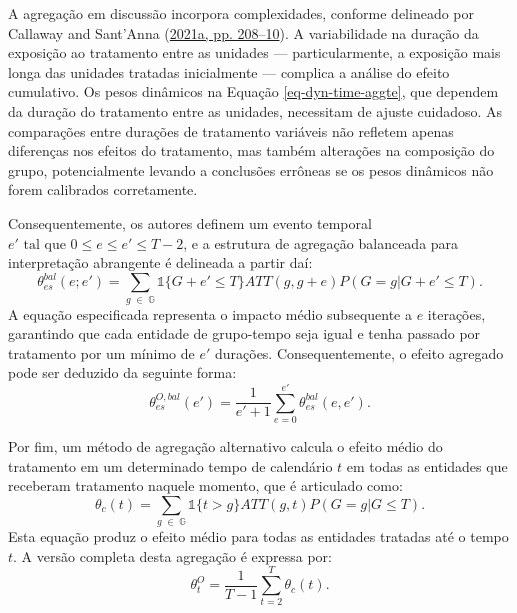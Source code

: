 \documentclass[12pt, a4paper, twoside]{article}
\numberwithin{equation}{subsection} %
\begin{document}
A agregação em discussão incorpora complexidades, conforme delineado por
Callaway and Sant'Anna (\protect\hyperlink{ref-CALLAWAY2021200}{2021a,
pp. 208--10}). A variabilidade na duração da exposição ao tratamento
entre as unidades --- particularmente, a exposição mais longa das
unidades tratadas inicialmente --- complica a análise do efeito
cumulativo. Os pesos dinâmicos na Equação \eqref{eq-dyn-time-aggte}, que
dependem da duração do tratamento entre as unidades, necessitam de
ajuste cuidadoso. As comparações entre durações de tratamento variáveis
\hspace{0pt}\hspace{0pt}não refletem apenas diferenças nos efeitos do
tratamento, mas também alterações na composição do grupo, potencialmente
levando a conclusões errôneas se os pesos dinâmicos não forem calibrados
corretamente.

Consequentemente, os autores definem um evento temporal
\(e' \text{ tal que } 0 \leq e \leq e' \leq T - 2\), e a estrutura de
agregação balanceada para interpretação abrangente é delineada a partir
daí: \begin{equation} \label{eq-bal-dyn-time-aggte}
\theta_{es}^{bal}(e; e') = \sum_{g \; \in \; \mathbb{G}} \mathds{1}\{G + e' \leq T\} ATT(g, g + e) ​​P(G = g|G + e' \leq T).
\end{equation} A equação especificada representa o impacto médio
subsequente a \(e\) iterações, garantindo que cada entidade de
grupo-tempo seja igual e tenha passado por tratamento por um mínimo de
\(e'\) durações. Consequentemente, o efeito agregado pode ser deduzido
da seguinte forma: \begin{equation} \label{eq-dyn-bal-overall}
\theta_{es}^{O, bal}(e') = \frac{1}{e' + 1} \sum_{e = 0}^{e'} \theta_{es}^{bal}(e, e').
\end{equation}

Por fim, um método de agregação alternativo calcula o efeito médio do
tratamento em um determinado tempo de calendário \(t\) em todas as
entidades que receberam tratamento naquele momento, que é articulado
como: \begin{equation} \label{eq-cal-time-aggte}
\theta_{c}(t) = \sum_{g \; \in \; \mathbb{G}} \mathds{1}\{t > g\} ATT(g, t) P(G = g| G \leq T).
\end{equation} Esta equação produz o efeito médio para todas as
entidades tratadas até o tempo \(t\). A versão completa desta agregação
é expressa por: \begin{equation} \label{eq-dyn-overall}
\theta_{t}^O = \frac{1}{T-1} \sum_{t = 2}^{T} \theta_{c}(t).
\end{equation}
\end{document}
